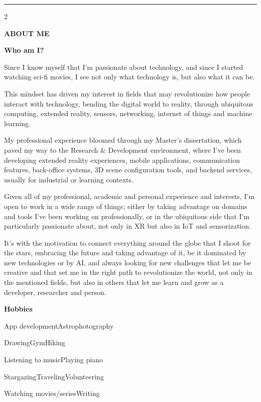 \documentclass[10pt,a4paper]{article}
\newcommand{\currentsectioncolor}{sec-about-me}
\newcommand{\cvsectiontitle}[2]{%
  \vspace{10pt}%
  {\large\bfseries\addfontfeatures{LetterSpace=5}\color{#1}\MakeUppercase{#2}}\par
  \vspace{-3pt}{\color{#1}\rule{\linewidth}{1.35pt}}\par\vspace{10pt}%
  \gdef\currentsectioncolor{#1}%
}
\newcommand{\entrytitlesize}{\normalsize\bfseries}
\newcommand{\cvinlineruleheading}[2]{%
  \par\noindent
  {\entrytitlesize\color{\currentsectioncolor}#1}%
  \nobreak\hspace{0.45em}{\color{\currentsectioncolor}\leaders\hbox{\rule[0.52ex]{2.6pt}{0.6pt}\hskip 1.6pt}\hfill}\kern0pt\par\vspace{#2}%
}
\newcommand{\cvsubheading}[1]{%
  \cvinlineruleheading{#1}{2pt}%
}
\newcommand{\listlead}{\textcolor{\currentsectioncolor}{\textbullet}\hspace{0.45em}}
\newcommand{\listsep}{\hspace{0.55em}\textcolor{\currentsectioncolor}{\textbullet}\hspace{0.55em}}
\newcommand{\bulletrow}[1]{%
  {\normalsize\color{textsecondary}\listlead#1\par}%
}
\begin{document}
\vspace{4pt}
{\color{sec-start}\rule{\linewidth}{1.8pt}}\par
\vspace{5pt}

\begin{paracol}{2}
\raggedright
  \cvsectiontitle{sec-about-me}{About me}

  \cvsubheading{Who am I?}
  {\small\color{textsecondary}%
    Since I know myself that I'm passionate about technology, and since I started watching sci-fi movies, I see not only what technology is, but also what it can be.

    This mindset has driven my interest in fields that may revolutionize how people interact with technology, bending the digital world to reality, through ubiquitous computing, extended reality, sensors, networking, internet of things and machine learning.

    My professional experience bloomed through my Master's dissertation, which paved my way to the Research \& Development environment, where I've been developing extended reality experiences, mobile applications, communication features, back-office systems, 3D scene configuration tools, and backend services, usually for industrial or learning contexts.

    Given all of my professional, academic and personal experience and interests, I'm open to work in a wide range of things; either by taking advantage on domains and tools I've been working on professionally, or in the ubiquitous side that I'm particularly passionate about, not only in XR but also in IoT and sensorization.
    
    It's with the motivation to connect everything around the globe that I shoot for the stars, embracing the future and taking advantage of it, be it dominated by new technologies or by AI, and always looking for new challenges that let me be creative and that set me in the right path to revolutionize the world, not only in the mentioned fields, but also in others that let me learn and grow as a developer, researcher and person.\par
  }

  \vspace{5pt}
  \cvsubheading{Hobbies}
  \bulletrow{App development\listsep Astrophotography}
  \bulletrow{Drawing\listsep Gym\listsep Hiking}
  \bulletrow{Listening to music\listsep Playing piano}
  \bulletrow{Stargazing\listsep Traveling\listsep Volunteering}
  \bulletrow{Watching movies/series\listsep Writing}


\end{paracol}
\end{document}
